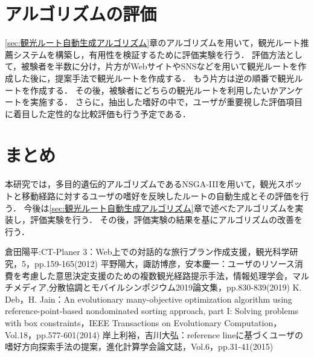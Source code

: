 \section{アルゴリズムの評価}\label{sec:アルゴリズムの評価}
\ref{sec:観光ルート自動生成アルゴリズム}章のアルゴリズムを用いて，観光ルート推薦システムを構築し，有用性を検証するために評価実験を行う．
評価方法として，被験者を半数に分け，片方がWebサイトやSNSなどを用いて観光ルートを作成した後に，提案手法で観光ルートを作成する．
もう片方は逆の順番で観光ルートを作成する．
その後，被験者にどちらの観光ルートを利用したいかアンケートを実施する．
さらに，抽出した嗜好の中で，ユーザが重要視した評価項目に着目した定性的な比較評価も行う予定である．

\section{まとめ}\label{sec:まとめ}
本研究では，多目的遺伝的アルゴリズムであるNSGA-I\hspace{-.1em}I\hspace{-.1em}Iを用いて，観光スポットと移動経路に対するユーザの嗜好を反映したルートの自動生成とその評価を行う．
今後は\ref{sec:観光ルート自動生成アルゴリズム}章で述べたアルゴリズムを実装し，評価実験を行う．
その後，評価実験の結果を基にアルゴリズムの改善を行う．

\begin{thebibliography}{99}
 倉田陽平:CT-Planer 3：Web上での対話的な旅行プラン作成支援，観光科学研究，5，pp.159-165(2012)
 平野陽大，諏訪博彦，安本慶一：ユーザのリソース消費を考慮した意思決定支援のための複数観光経路提示手法，情報処理学会，マルチメディア,分散協調とモバイルシンポジウム2019論文集，pp.830-839(2019)
 K. Deb，H. Jain：An evolutionary many-objective optimization algorithm using reference-point-based nondominated sorting approach, part I: Solving problems with box constraints，IEEE Transactions on Evolutionary Computation，Vol.18，pp.577-601(2014)
 岸上利裕，吉川大弘：reference lineに基づくユーザの嗜好方向探索手法の提案，進化計算学会論文誌，Vol.6，pp.31-41(2015)
\end{thebibliography}

%
%
